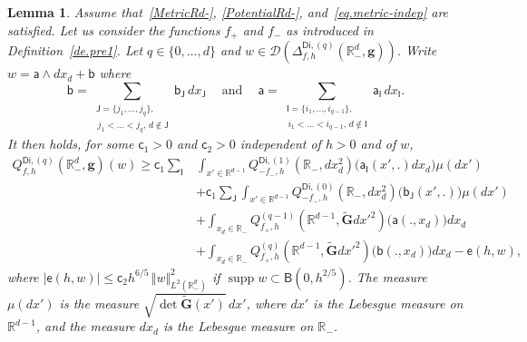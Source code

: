 \documentclass[10pt]{amsart}
\newcommand{\quand}{\quad\text{and}\quad}
\newcommand{\mbf}[1]{\mathbf{#1}}
\DeclareMathOperator\supp{supp}
\theoremstyle{plain}
\newtheorem{lemma}[proposition]{Lemma}
\theoremstyle{definition}
\begin{document}
\begin{lemma}\label{le.splitting}
Assume that~\ref{MetricRd-}, \ref{PotentialRd-},
and~\eqref{eq.metric-indep} are satisfied. Let us consider the
functions $f_+$ and $f_-$ as introduced in Definition~\ref{de.pre1}.
Let $q\in \{0,\ldots,d\}$ and $w\in \mathcal D(\Delta^{\mathsf{Di},(q)}_{f,h}(\mathbb R_-^d, \mbf g))$.
Write $w=\mathsf a \wedge dx_d+ \mathsf b$
where
\[
\mathsf b = \sum_{\substack{\mathsf J=\{j_1,\ldots,j_q\},\\ \, j_1<\ldots<j_q, \, d\notin \mathsf J} } \mathsf b_{\mathsf J}\, dx_{\mathsf J} \ \quand \ \mathsf a =\sum_{\substack{\mathsf I =\{i_1,\ldots,i_{q-1}\},\\ \, i_1<\ldots<i_{q-1},\,d\notin \mathsf I }} \mathsf a_{\mathsf I}\, dx_{\mathsf I}.
\]
It then holds, for some $\mathsf c_1>0$ and $\mathsf c_2>0$
independent of $h>0$ and of $w$,
\begin{align*}
\nonumber
Q^{\mathsf{Di},(q)}_{f,h}(\mathbb R_-^d, \mbf g)(w) \ge \mathsf c_1 \sum_{\mathsf I }& \int_{x'\in \mathbb R^{d-1} } Q^{\mathsf{Di},(1)}_{-f_-,h}(\mathbb R_-, dx_d^2)\bigl(\mathsf a_{\mathsf I}(x',.)dx_d \bigr) \mu(dx')\\
& + \mathsf c _1\sum_{\mathsf J } \int_{x'\in \mathbb R^{d-1} } Q^{\mathsf{Di},(0)}_{-f_-,h}(\mathbb R_-, dx_d^2)\bigl(\mathsf b_{\mathsf J}(x',.) \bigr) \mu(dx')\\
& + \int_{x_d\in \mathbb R_- } Q^{(q-1)}_{f_+,h}(\mathbb R^{d-1}, \tilde {\mbf G}dx'^2)\bigl(\mathsf a(.,x_d)\bigr) dx_d \\
& + \int_{x_d\in \mathbb R_- } Q^{(q)}_{f_+,h}(\mathbb
R^{d-1}, \tilde {\mbf G}dx'^2)\bigl(\mathsf b(.,x_d) \big) dx_d - \mathsf e(h,w),
\end{align*}
where $\vert \mathsf e(h,w)\vert \le \mathsf c_2h^{6/5}\, \Vert w
\Vert_{L^2(\mathbb R^d_-)}^2$ if $\supp w\subset \mathsf B(0,h^{2/5})$.
The measure $\mu(dx')$ is the measure $\sqrt{\det \tilde {\mbf G}(x')} \, dx'$, where $dx'$ is the Lebesgue measure on $\mathbb R^{d-1}$, and the measure $dx_d$ is the Lebesgue measure on $\mathbb R_-$.
\end{lemma}
\end{document}
